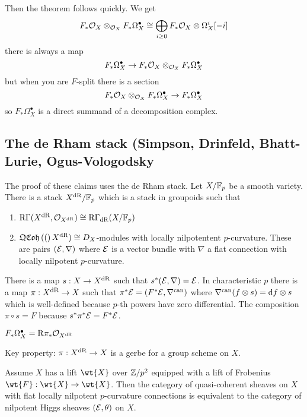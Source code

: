 \documentclass[12pt]{article}
\newcommand{\R}{\mathrm{R}}
\begin{document}
Then the theorem follows quickly. We get
\[ F_* \mathcal{O}_{X} \otimes_{\mathcal{O}_{X}} F_* \Omega_X^\bullet \cong \bigoplus_{i \ge 0} F_* \mathcal{O}_{X} \otimes \Omega_X^i[-i] \]
there is always a map
\[ F_* \Omega_X^\bullet \to F_* \mathcal{O}_{X} \otimes_{\mathcal{O}_{X}} F_* \Omega_X^\bullet \]
but when you are $F$-split there is a section
\[ F_* \mathcal{O}_{X} \otimes_{\mathcal{O}_{X}} F_* \Omega_X^\bullet \to F_* \Omega_X^\bullet \]
so $F_* \Omega_X^\bullet$ is a direct summand of a decomposition complex. 

\subsection{The de Rham stack (Simpson, Drinfeld, Bhatt-Lurie, Ogus-Vologodsky}

The proof of these claims uses the de Rham stack. Let $X / \mathbb{F}_p$ be a smooth variety. There is a stack $X^{\mathrm{dR}} / \mathbb{F}_p$ which is a \etale stack in groupoids such that
\begin{enumerate}
\item $\R \Gamma(X^{\dR}, \struct{X^{\dR}}) \cong \R \Gamma_{\dR}(X/\FF_p)$
\item $\mathfrak{QCoh}\left((\right)X^{\mathrm{dR}}) \cong D_X$-modules with locally nilpotentent $p$-curvature. These are pairs $(\mathcal{E}, \nabla)$ where $\mathcal{E}$ is a vector bundle with $\nabla$ a flat connection with locally nilpotent $p$-curvature. 
\end{enumerate}

There is a map $s : X \to X^{\mathrm{dR}}$ such that $s^* (\mathcal{E}, \nabla) = \mathcal{E}$. In characteristic $p$ there is a map $\pi : X^{\mathrm{dR}} \to X$ such that $\pi^* \mathcal{E} = (F^* \mathcal{E}, \nabla^{\text{can}})$ where $\nabla^{\text{can}}(f \otimes s) = \mathrm{d}{f} \otimes s$ which is well-defined because $p$-th powers have zero differential. The composition $\pi \circ s = F$ because $s^* \pi^* \mathcal{E} = F^* \mathcal{E}$. 

\begin{prop}
$F_* \Omega_X^\bullet = \R \pi_* \struct{X^{\dR}}$
\end{prop} 

Key property: $\pi : X^{\mathrm{dR}} \to X$ is a gerbe for a group scheme on $X$. 

\begin{lemma}
Assume $X$ has a lift $\wt{X}$ over $\mathbb{Z} / p^2$ equipped with a lift of Frobenius $\wt{F} : \wt{X} \to \wt{X}$. Then the category of quasi-coherent sheaves on $X$ with flat locally nilpotent $p$-curvature connections is equivalent to the category of nilpotent Higgs sheaves $(\mathcal{E}, \theta)$ on $X$. 
\end{lemma}
\end{document}
